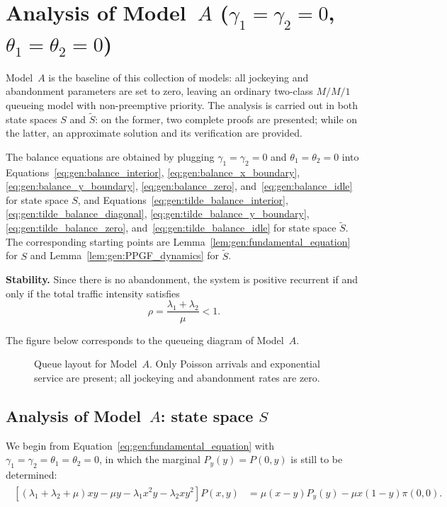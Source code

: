 \section{Analysis of Model~\texorpdfstring{$A$}{A} (\texorpdfstring{$\gamma_1=\gamma_2=0$}{gamma1=gamma2=0}, \texorpdfstring{$\theta_1=\theta_2=0$}{theta1=theta2=0})}\label{sec:model_a}

Model~$A$ is the baseline of this collection of models: all jockeying and abandonment
parameters are set to zero, leaving an ordinary two-class $M/M/1$ queueing model with
non-preemptive priority. The analysis is carried out in both state spaces $S$ and
$\widetilde{S}$: on the former, two complete proofs are presented; while on the latter,
an approximate solution and its verification are provided.

The balance equations are obtained by plugging $\gamma_1=\gamma_2=0$ and
$\theta_1=\theta_2=0$ into Equations~\eqref{eq:gen:balance_interior},
\eqref{eq:gen:balance_x_boundary}, \eqref{eq:gen:balance_y_boundary},
\eqref{eq:gen:balance_zero}, and~\eqref{eq:gen:balance_idle} for state space $S$, and
Equations~\eqref{eq:gen:tilde_balance_interior},
\eqref{eq:gen:tilde_balance_diagonal}, \eqref{eq:gen:tilde_balance_y_boundary},
\eqref{eq:gen:tilde_balance_zero}, and~\eqref{eq:gen:tilde_balance_idle} for state
space $\widetilde{S}$. The corresponding starting points are
Lemma~\ref{lem:gen:fundamental_equation} for $S$ and
Lemma~\ref{lem:gen:PPGF_dynamics} for $\widetilde{S}$.

\textbf{Stability.} Since there is no abandonment, the system is positive recurrent if
and only if the total traffic intensity satisfies
\begin{equation}
    \rho = \frac{\lambda_1+\lambda_2}{\mu} < 1.
    \label{eq:A:stability}
\end{equation}

The figure below corresponds to the queueing diagram of Model~$A$.
\begin{figure}[H]
    \centering
    \resizebox{0.62\textwidth}{!}{%
    }
    \caption{Queue layout for Model~$A$. Only Poisson arrivals and exponential service
    are present; all jockeying and abandonment rates are zero.}
    \label{fig:model-a-queue}
\end{figure}

\subsection{Analysis of Model~\texorpdfstring{$A$}{A}: state space \texorpdfstring{$S$}{S}}
We begin from Equation~\eqref{eq:gen:fundamental_equation} with
$\gamma_1=\gamma_2=\theta_1=\theta_2=0$, in which the marginal $P_y(y)=P(0,y)$ is
still to be determined:
\begin{align}
    \begin{split}
        \left[ (\lambda_1+\lambda_2+ \mu)xy - \mu y - \lambda_1 x^2 y - \lambda_2 x y^2 \right] P(x,y)
         &= \mu(x-y) P_y(y)
         - \mu x(1-y) \pi(0,0).
    \end{split} \label{eq:A:fundamental}
\end{align}


